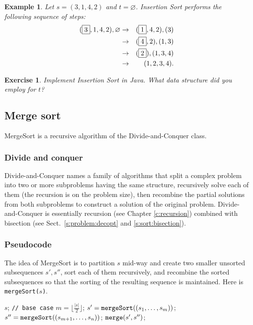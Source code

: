\documentclass[a4paper]{book}
\theoremstyle{changebreak}                %
\newtheorem{eg}[result]{Example}
\newtheorem{ex}[result]{Exercise}
\begin{document}
\begin{eg}
Let $s=(3,1,4,2)$ and $t=\varnothing$. {\sc Insertion Sort} performs
the following sequence of steps: 
\begin{eqnarray*}
(\fbox{$3$},1,4,2),\varnothing &\to& (\fbox{$1$},4,2),(3) \\
     &\to& (\fbox{$4$},2),(1,3) \\
     &\to& (\fbox{$2$}),(1,3,4) \\
     &\to& (1,2,3,4).
\end{eqnarray*}
\end{eg}

\begin{ex}
Implement {\sc Insertion Sort} in Java. What data structure did you
employ for $t$?
\end{ex}

\subsection{Merge sort}
{\sc MergeSort} is a recursive
algorithm of the {\sc
  Divide-and-Conquer} class.

\subsubsection{Divide and conquer}
\label{s:sort:merge:divconq}
{\sc Divide-and-Conquer} names a family of algorithms that split a
complex problem into two or more
subproblems having the same structure, recursively
solve each of them (the recursion is on the problem
size), then recombine the partial
solutions from both
subproblems to construct a solution
of the original problem. {\sc Divide-and-Conquer} is essentially
recursion (see Chapter \ref{c:recursion}) combined
with bisection (see Sect.~\ref{s:problem:decopt} and
\ref{s:sort:bisection}).

\subsubsection{Pseudocode}
The idea of {\sc MergeSort} is to
partition $s$ mid-way and create two smaller unsorted subsequences
$s',s''$, sort each of them recursively, and recombine the sorted
subsequences so that the sorting of the resulting sequence is
maintained. Here is {\tt mergeSort($s$)}.
\begin{algorithmic}[1]
  \RETURN $s$; {\tt // base case}
\ELSE
  \STATE $m=\lfloor\frac{|s|}{2}\rfloor$;
  \STATE $s'=\mbox{\tt mergeSort}((s_1,\ldots,s_m))$;
  \STATE $s''=\mbox{\tt mergeSort}((s_{m+1},\ldots,s_n))$;
  \RETURN $\mbox{\tt merge}(s',s'')$;
\ENDIF
\end{algorithmic}
\end{document}
